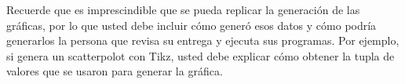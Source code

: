 \begin{mdframed}
    Recuerde que es imprescindible que se pueda replicar la generación de las gráficas, por lo que usted debe incluir cómo generó esos datos y  cómo podría generarlos la persona que revisa su entrega y ejecuta sus programas. Por ejemplo, si genera un scatterpolot con Tikz, usted debe explicar cómo obtener la tupla de valores que se usaron para generar la gráfica.
\end{mdframed}
